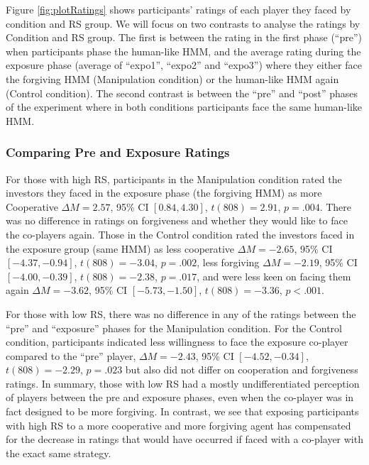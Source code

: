 \documentclass[
]{article}
\begin{document}
Figure \ref{fig:plotRatings} shows participants' ratings of each player
they faced by condition and RS group. We will focus on two contrasts to
analyse the ratings by Condition and RS group. The first is between the
rating in the first phase (``pre'') when participants phase the human-like
HMM, and the average rating during the exposure phase (average of
``expo1'', ``expo2'' and ``expo3'') where they either face the forgiving HMM
(Manipulation condition) or the human-like HMM again (Control
condition). The second contrast is between the ``pre'' and ``post'' phases
of the experiment where in both conditions participants face the same
human-like HMM.

\subsubsection{Comparing Pre and Exposure Ratings}\label{comparing-pre-and-exposure-ratings}

For those with high RS, participants in the Manipulation condition rated
the investors they faced in the exposure phase (the forgiving HMM) as
more Cooperative
\(\Delta M = 2.57\), 95\% CI \([0.84, 4.30]\), \(t(808) = 2.91\), \(p = .004\).
There was no difference in ratings on forgiveness and whether they would
like to face the co-players again. Those in the Control condition rated
the investors faced in the exposure group (same HMM) as less cooperative
\(\Delta M = -2.65\), 95\% CI \([-4.37, -0.94]\), \(t(808) = -3.04\), \(p = .002\),
less forgiving
\(\Delta M = -2.19\), 95\% CI \([-4.00, -0.39]\), \(t(808) = -2.38\), \(p = .017\),
and were less keen on facing them again
\(\Delta M = -3.62\), 95\% CI \([-5.73, -1.50]\), \(t(808) = -3.36\), \(p < .001\).

For those with low RS, there was no difference in any of the ratings
between the ``pre'' and ``exposure'' phases for the Manipulation condition.
For the Control condition, participants indicated less willingness to
face the exposure co-player compared to the ``pre'' player,
\(\Delta M = -2.43\), 95\% CI \([-4.52, -0.34]\), \(t(808) = -2.29\), \(p = .023\)
but also did not differ on cooperation and forgiveness ratings. In
summary, those with low RS had a mostly undifferentiated perception of
players between the pre and exposure phases, even when the co-player was
in fact designed to be more forgiving. In contrast, we see that exposing
participants with high RS to a more cooperative and more forgiving agent
has compensated for the decrease in ratings that would have occurred if
faced with a co-player with the exact same strategy.
\end{document}
